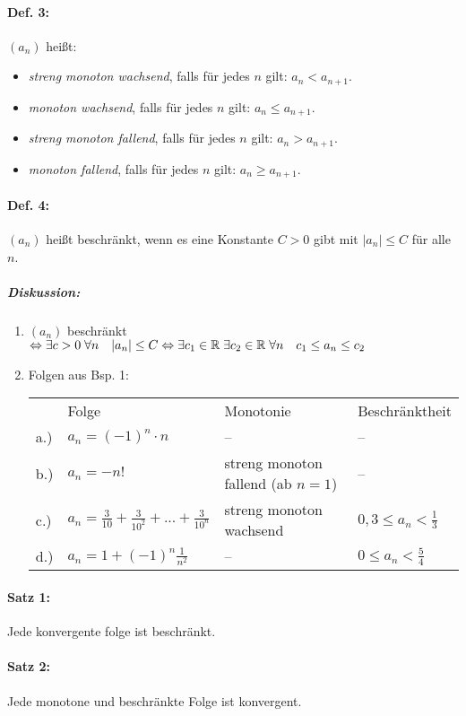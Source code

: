 \paragraph{Def. 3:} \parskp
$(a_n)$ heißt:
\begin{itemize}
\item \emph{streng monoton wachsend}, falls für jedes $n$ gilt: $a_n<a_{n+1}$.
\item \emph{monoton wachsend}, falls für jedes $n$ gilt: $a_n\leq a_{n+1}$.
\item \emph{streng monoton fallend}, falls für jedes $n$ gilt: $a_n>a_{n+1}$.
\item \emph{monoton fallend}, falls für jedes $n$ gilt: $a_n\geq a_{n+1}$.
\end{itemize}
\paragraph{Def. 4:} \parskp
$(a_n)$ heißt beschränkt, wenn es eine Konstante $C>0$ gibt mit $|a_n|\leq C$ für alle $n$.
\subparagraph{Diskussion:}
\begin{enumerate}
\item $(a_n)$ beschränkt \\
$\Leftrightarrow \exists c>0 \; \forall n \quad |a_n| \leq C \\
\Leftrightarrow \exists c_1\in \mathbb{R}\; \exists c_2 \in \mathbb{R}\; \forall n \quad c_1 \leq a_n \leq c_2$
\item Folgen aus Bsp. 1:\\
\begin{tabular}{l l l l}
&Folge & Monotonie & Beschränktheit\\
a.)& $a_n=(-1)^n\cdot n$ & --  & --\\
b.)& $a_n=-n!$ & streng monoton fallend (ab $n=1$) & --\\
c.)& $a_n=\tfrac{3}{10}+\tfrac{3}{10^2}+...+\tfrac{3}{10^n}$ & streng monoton wachsend & $0,3\leq a_n < \tfrac{1}{3}$\\
d.) & $a_n=1+(-1)^n\tfrac{1}{n^2}$ & -- & $0\leq a_n <\tfrac{5}{4}$
\end{tabular}
\end{enumerate}
\paragraph{Satz 1:} \parskp
Jede konvergente folge ist beschränkt.
\paragraph{Satz 2:} \parskp
Jede monotone und beschränkte Folge ist konvergent.
